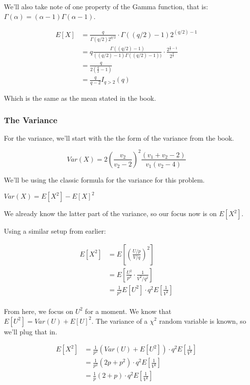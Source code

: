 We'll also take note of one property of the Gamma function, that is: $\Gamma(\alpha) = (\alpha-1)\Gamma(\alpha - 1)$. 

\begin{align*}
	E[X] &= \frac{q}{\Gamma(q/2) 2^{q/2}} \cdot \Gamma\left( (q/2) - 1 \right) 2^{(q/2)-1}  \\
	&= q \frac{\Gamma((q/2) - 1)}{((q/2) - 1)\Gamma((q/2) - 1))} \cdot \frac{2^{\frac{q}{2} - 1}}{2^{\frac{q}{2}}} \\
	&= \frac{q}{2\left( \frac{q}{2} - 1 \right)} \\
	&= \frac{q}{q-2} I_{q>2}(q)
\end{align*}

Which is the same as the mean stated in the book.

\subsubsection*{The Variance}

For the variance, we'll start with the the form of the variance from the book.

\[
	Var(X) = 2\left( \frac{v_2}{v_2 - 2} \right)^2 \frac{(v_1 + v_2 - 2)}{v_1(v_2-4)}
\]

We'll be using the classic formula for the variance for this problem.

$Var(X) = E[X^2] - E[X]^2$

We already know the latter part of the variance, so our focus now is on $E[X^2]$. 

Using a similar setup from earlier:

\begin{align*}
E[X^2] &= E\left[ \left(\frac{U/p}{V/q}\right)^2 \right] \\
&= E\left[ \frac{U^2}{p^2} \cdot \frac{1}{V^2/q^2} \right] \\
&= \frac{1}{p^2}E[U^2] \cdot q^2E\left[ \frac{1}{V^2} \right] \\
\end{align*}

From here, we focus on $U^2$ for a moment. We know that $E[U^2] = Var(U) + E[U]^2$. The variance of a $\chi^2$ random variable is known, so we'll plug that in.

\begin{align*}
	E[X^2] &= \frac{1}{p^2} \left( Var(U) + E[U^2] \right) \cdot q^2E\left[ \frac{1}{V^2} \right] \\
	&= \frac{1}{p^2} \left( 2p + p^2 \right) \cdot q^2E\left[ \frac{1}{V^2} \right] \\
	&= \frac{1}{p} \left( 2 + p \right) \cdot q^2E\left[ \frac{1}{V^2} \right] \\
\end{align*}

